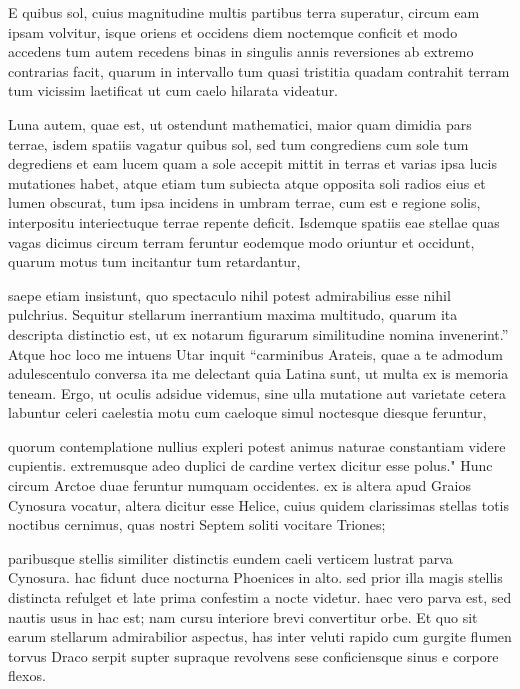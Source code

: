  E quibus sol, cuius magnitudine multis partibus terra superatur, circum eam ipsam volvitur, isque oriens et occidens diem noctemque conficit et modo accedens tum autem recedens binas in singulis annis reversiones ab extremo contrarias facit, quarum in intervallo tum quasi tristitia quadam contrahit terram tum vicissim laetificat ut cum caelo hilarata videatur.

 Luna autem, quae est, ut ostendunt mathematici, maior quam dimidia pars terrae, isdem spatiis vagatur quibus sol, sed tum congrediens cum sole tum degrediens et eam lucem quam a sole accepit mittit in terras et varias ipsa lucis mutationes habet, atque etiam tum subiecta atque opposita soli radios eius et lumen obscurat, tum ipsa incidens in umbram terrae, cum est e regione solis, interpositu interiectuque terrae repente deficit. Isdemque spatiis eae stellae quas vagas dicimus circum terram feruntur eodemque modo oriuntur et occidunt, quarum motus tum incitantur tum retardantur,

 saepe etiam insistunt, quo spectaculo nihil potest admirabilius esse nihil pulchrius. Sequitur stellarum inerrantium maxima multitudo, quarum ita descripta distinctio est, ut ex notarum figurarum similitudine nomina invenerint.'' Atque hoc loco me intuens Utar inquit ``carminibus Arateis, quae a te admodum adulescentulo conversa ita me delectant quia Latina sunt, ut multa ex is memoria teneam. Ergo, ut oculis adsidue videmus, sine ulla mutatione aut varietate cetera labuntur celeri caelestia motu cum caeloque simul noctesque diesque feruntur,

 quorum contemplatione nullius expleri potest animus naturae constantiam videre cupientis. extremusque adeo duplici de cardine vertex dicitur esse polus." Hunc circum Arctoe duae feruntur numquam occidentes. ex is altera apud Graios Cynosura vocatur, altera dicitur esse Helice, cuius quidem clarissimas stellas totis noctibus cernimus, quas nostri Septem soliti vocitare Triones;

 paribusque stellis similiter distinctis eundem caeli verticem lustrat parva Cynosura. hac fidunt duce nocturna Phoenices in alto. sed prior illa magis stellis distincta refulget et late prima confestim a nocte videtur. haec vero parva est, sed nautis usus in hac est; nam cursu interiore brevi convertitur orbe. Et quo sit earum stellarum admirabilior aspectus, has inter veluti rapido cum gurgite flumen torvus Draco serpit supter supraque revolvens sese conficiensque sinus e corpore flexos.

